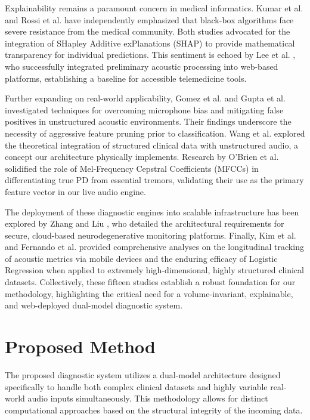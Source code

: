 \documentclass[conference]{IEEEtran}
\begin{document}
Explainability remains a paramount concern in medical informatics. Kumar et al. \cite{kumar2025explainable} and Rossi et al. \cite{rossi2024shap} have independently emphasized that black-box algorithms face severe resistance from the medical community. Both studies advocated for the integration of SHapley Additive exPlanations (SHAP) to provide mathematical transparency for individual predictions. This sentiment is echoed by Lee et al. \cite{lee2025real}, who successfully integrated preliminary acoustic processing into web-based platforms, establishing a baseline for accessible telemedicine tools. 

Further expanding on real-world applicability, Gomez et al. \cite{gomez2024overcoming} and Gupta et al. \cite{gupta2025mitigating} investigated techniques for overcoming microphone bias and mitigating false positives in unstructured acoustic environments. Their findings underscore the necessity of aggressive feature pruning prior to classification. Wang et al. \cite{wang2025integrating} explored the theoretical integration of structured clinical data with unstructured audio, a concept our architecture physically implements. Research by O'Brien et al. \cite{obrien2023role} solidified the role of Mel-Frequency Cepstral Coefficients (MFCCs) in differentiating true PD from essential tremors, validating their use as the primary feature vector in our live audio engine. 

The deployment of these diagnostic engines into scalable infrastructure has been explored by Zhang and Liu \cite{zhang2024cloud}, who detailed the architectural requirements for secure, cloud-based neurodegenerative monitoring platforms. Finally, Kim et al. \cite{kim2026longitudinal} and Fernando et al. \cite{fernando2023logistic} provided comprehensive analyses on the longitudinal tracking of acoustic metrics via mobile devices and the enduring efficacy of Logistic Regression when applied to extremely high-dimensional, highly structured clinical datasets. Collectively, these fifteen studies establish a robust foundation for our methodology, highlighting the critical need for a volume-invariant, explainable, and web-deployed dual-model diagnostic system.

\section{Proposed Method}
The proposed diagnostic system utilizes a dual-model architecture designed specifically to handle both complex clinical datasets and highly variable real-world audio inputs simultaneously. This methodology allows for distinct computational approaches based on the structural integrity of the incoming data.
\end{document}
